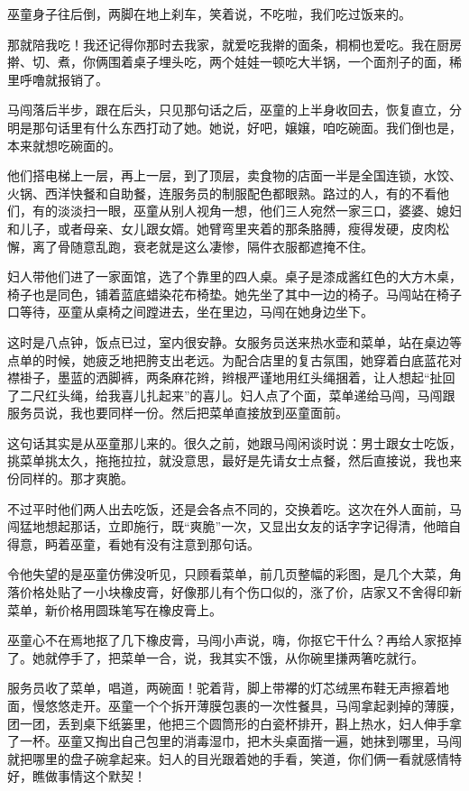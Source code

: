\documentclass[lang=cn,newtx,12pt,scheme=chinese]{elegantbook}
\begin{document}
巫童身子往后倒，两脚在地上刹车，笑着说，不吃啦，我们吃过饭来的。

那就陪我吃！我还记得你那时去我家，就爱吃我擀的面条，桐桐也爱吃。我在厨房擀、切、煮，你俩围着桌子埋头吃，两个娃娃一顿吃大半锅，一个面剂子的面，稀里呼噜就报销了。

马闯落后半步，跟在后头，只见那句话之后，巫童的上半身收回去，恢复直立，分明是那句话里有什么东西打动了她。她说，好吧，嬢嬢，咱吃碗面。我们倒也是，本来就想吃碗面的。

他们搭电梯上一层，再上一层，到了顶层，卖食物的店面一半是全国连锁，水饺、火锅、西洋快餐和自助餐，连服务员的制服配色都眼熟。路过的人，有的不看他们，有的淡淡扫一眼，巫童从别人视角一想，他们三人宛然一家三口，婆婆、媳妇和儿子，或者母亲、女儿跟女婿。她臂弯里夹着的那条胳膊，瘦得发硬，皮肉松懈，离了骨随意乱跑，衰老就是这么凄惨，隔件衣服都遮掩不住。

妇人带他们进了一家面馆，选了个靠里的四人桌。桌子是漆成酱红色的大方木桌，椅子也是同色，铺着蓝底蜡染花布椅垫。她先坐了其中一边的椅子。马闯站在椅子口等待，巫童从桌椅之间蹚进去，坐在里边，马闯在她身边坐下。

这时是八点钟，饭点已过，室内很安静。女服务员送来热水壶和菜单，站在桌边等点单的时候，她疲乏地把胯支出老远。为配合店里的复古氛围，她穿着白底蓝花对襟褂子，墨蓝的洒脚裤，两条麻花辫，辫根严谨地用红头绳捆着，让人想起“扯回了二尺红头绳，给我喜儿扎起来”的喜儿。妇人点了个面，菜单递给马闯，马闯跟服务员说，我也要同样一份。然后把菜单直接放到巫童面前。

这句话其实是从巫童那儿来的。很久之前，她跟马闯闲谈时说：男士跟女士吃饭，挑菜单挑太久，拖拖拉拉，就没意思，最好是先请女士点餐，然后直接说，我也来份同样的。那才爽脆。

不过平时他们两人出去吃饭，还是会各点不同的，交换着吃。这次在外人面前，马闯猛地想起那话，立即施行，既“爽脆”一次，又显出女友的话字字记得清，他暗自得意，眄着巫童，看她有没有注意到那句话。

令他失望的是巫童仿佛没听见，只顾看菜单，前几页整幅的彩图，是几个大菜，角落价格处贴了一小块橡皮膏，好像那儿有个伤口似的，涨了价，店家又不舍得印新菜单，新价格用圆珠笔写在橡皮膏上。

巫童心不在焉地抠了几下橡皮膏，马闯小声说，嗨，你抠它干什么？再给人家抠掉了。她就停手了，把菜单一合，说，我其实不饿，从你碗里搛两箸吃就行。

服务员收了菜单，唱道，两碗面！驼着背，脚上带襻的灯芯绒黑布鞋无声擦着地面，慢悠悠走开。巫童一个个拆开薄膜包裹的一次性餐具，马闯拿起剥掉的薄膜，团一团，丢到桌下纸篓里，他把三个圆筒形的白瓷杯排开，斟上热水，妇人伸手拿了一杯。巫童又掏出自己包里的消毒湿巾，把木头桌面揩一遍，她抹到哪里，马闯就把哪里的盘子碗拿起来。妇人的目光跟着她的手看，笑道，你们俩一看就感情特好，瞧做事情这个默契！
\end{document}
